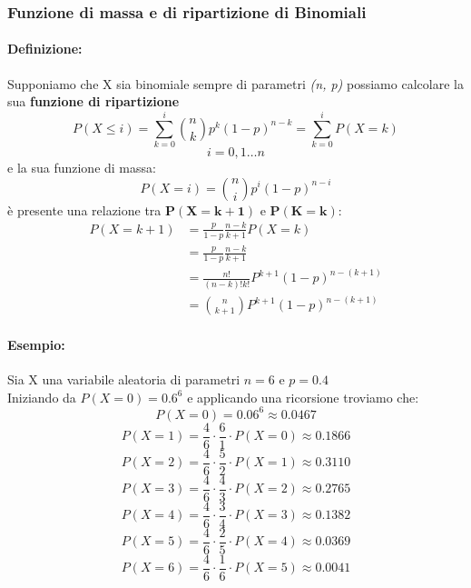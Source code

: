 \documentclass[]{article}
\newcommand{\definizione}{\paragraph{Definizione:}}
\begin{document}
    \subsubsection{Funzione di massa e di ripartizione di Binomiali}
    \definizione Supponiamo che  X sia binomiale sempre di parametri \textit{(n, p)} possiamo calcolare la sua \textbf{funzione di ripartizione}
    \[ P(X \leq i) = \sum_{k = 0}^{i} \binom{n}{k} p^k (1-p)^{n-k} = \sum_{k = 0}^{i} P(X = k) \]
    \[ i = 0,1 \ldots n \]
    e la sua funzione di massa:
    \[ P(X = i) = \binom{n}{i} p^i (1-p)^{n-i} \]
    è presente una relazione tra $\boldsymbol{P(X = k + 1)}$ e $\boldsymbol{P(K = k)}$:
    \begin{equation*}
        \begin{split}
            P(X = k + 1) &= \frac{p}{1 - p} \frac{n - k}{k + 1} P(X = k) \\
            & = \frac{p}{1 - p} \frac{n - k}{k + 1} \\ 
            & = \frac{n!}{(n-k)! k!} P^{k+1} (1-p)^{n-(k+1)} \\
            & = \binom{n}{k + 1} P^{k+1} (1-p)^{n-(k+1)}
        \end{split}
    \end{equation*}
    \paragraph{Esempio:} Sia X una variabile aleatoria di parametri $n = 6$ e $p = 0.4$ \\
    Iniziando da $P(X = 0) = 0.6^6$ e applicando una ricorsione troviamo che:
    \[ P(X = 0) = 0.06^6 \approx 0.0467 \]
    \[ P(X = 1) = \frac{4}{6} \cdot \frac{6}{1} \cdot P(X = 0) \approx 0.1866 \]
    \[ P(X = 2) = \frac{4}{6} \cdot \frac{5}{2} \cdot P(X = 1) \approx 0.3110 \]
    \[ P(X = 3) = \frac{4}{6} \cdot \frac{4}{3} \cdot P(X = 2) \approx 0.2765 \]
    \[ P(X = 4) = \frac{4}{6} \cdot \frac{3}{4} \cdot P(X = 3) \approx 0.1382 \]
    \[ P(X = 5) = \frac{4}{6} \cdot \frac{2}{5} \cdot P(X = 4) \approx 0.0369 \]
    \[ P(X = 6) = \frac{4}{6} \cdot \frac{1}{6} \cdot P(X = 5) \approx 0.0041 \]
\end{document}
